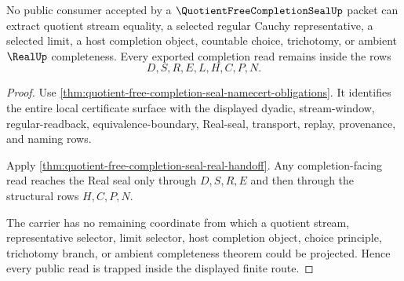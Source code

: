 \begin{theorem}
\label{thm:quotient-free-completion-seal-nonescape}
No public consumer accepted by a $\QuotientFreeCompletionSealUp$ packet can extract quotient stream equality, a selected regular Cauchy representative, a selected limit, a host completion object, countable choice, trichotomy, or ambient $\RealUp$ completeness. Every exported completion read remains inside the rows
$$
D,S,R,E,L,H,C,P,N .
$$
\end{theorem}
\begin{proof}
Use \autoref{thm:quotient-free-completion-seal-namecert-obligations}. It identifies the entire local certificate surface with the displayed dyadic, stream-window, regular-readback, equivalence-boundary, Real-seal, transport, replay, provenance, and naming rows.

Apply \autoref{thm:quotient-free-completion-seal-real-handoff}. Any completion-facing read reaches the Real seal only through $D,S,R,E$ and then through the structural rows $H,C,P,N$.

The carrier has no remaining coordinate from which a quotient stream, representative selector, limit selector, host completion object, choice principle, trichotomy branch, or ambient completeness theorem could be projected. Hence every public read is trapped inside the displayed finite route.
\end{proof}




